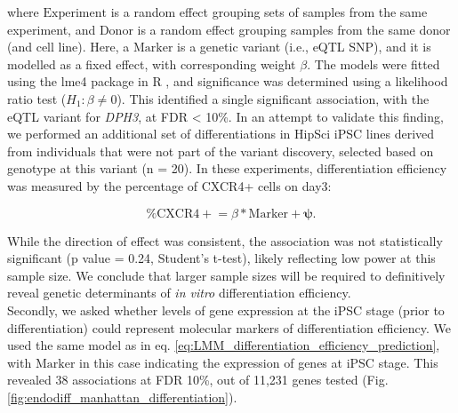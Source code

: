 where $\mathrm{Experiment}$ is a random effect grouping sets of samples from the same experiment, and $\mathrm{Donor}$ is a random effect grouping samples from the same donor (and cell line). 
Here, a $\mathrm{Marker}$ is a genetic variant (i.e., eQTL SNP), and it is modelled as a fixed effect, with corresponding weight $\beta$.
The models were fitted using the lme4 package in R \cite{bates2014fitting}, and significance was determined using a likelihood ratio test ($H_1: \beta \neq 0$).
This identified a single significant association, with the eQTL variant for \textit{DPH3}, at FDR < 10\%.
In an attempt to validate this finding, we performed an additional set of differentiations in HipSci iPSC lines derived from individuals that were not part of the variant discovery, selected based on genotype at this variant (n = 20). 
In these experiments, differentiation efficiency was measured by the percentage of CXCR4+ cells on day3:

\begin{equation}
    \mathrm{\% CXCR4+} = \beta*\mathrm{Marker} + \boldsymbol{\psi}.
\end{equation}

While the direction of effect was consistent, the association was not statistically significant (p value = 0.24, Student’s t-test), likely reflecting low power at this sample size. 
We conclude that larger sample sizes will be required to definitively reveal genetic determinants of \textit{in vitro} differentiation efficiency.\\

Secondly, we asked whether levels of gene expression at the iPSC stage (prior to differentiation) could represent molecular markers of differentiation efficiency.
We used the same model as in eq. \eqref{eq:LMM_differentiation_efficiency_prediction}, with $\mathrm{Marker}$ in this case indicating the expression of genes at iPSC stage.
This revealed 38 associations at FDR 10\%, out of 11,231 genes tested (Fig. \ref{fig:endodiff_manhattan_differentiation}).


